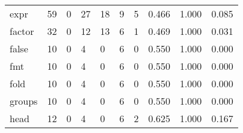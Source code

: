 \begin{longtable}{lp{1.3cm}p{1.3cm}p{1.3cm}p{1.3cm}p{1.3cm}p{1.3cm}p{1.3cm}p{1.3cm}p{1.3cm}}
expr      &                     59 &                                             0 &                                           27 &                                          18 &                                            9 &                                          5 &                                0.466 &                                  1.000 &                                0.085 \\
factor    &                     32 &                                             0 &                                           12 &                                          13 &                                            6 &                                          1 &                                0.469 &                                  1.000 &                                0.031 \\
false     &                     10 &                                             0 &                                            4 &                                           0 &                                            6 &                                          0 &                                0.550 &                                  1.000 &                                0.000 \\
fmt       &                     10 &                                             0 &                                            4 &                                           0 &                                            6 &                                          0 &                                0.550 &                                  1.000 &                                0.000 \\
fold      &                     10 &                                             0 &                                            4 &                                           0 &                                            6 &                                          0 &                                0.550 &                                  1.000 &                                0.000 \\
groups    &                     10 &                                             0 &                                            4 &                                           0 &                                            6 &                                          0 &                                0.550 &                                  1.000 &                                0.000 \\
head      &                     12 &                                             0 &                                            4 &                                           0 &                                            6 &                                          2 &                                0.625 &                                  1.000 &                                0.167 \\

\end{longtable}
